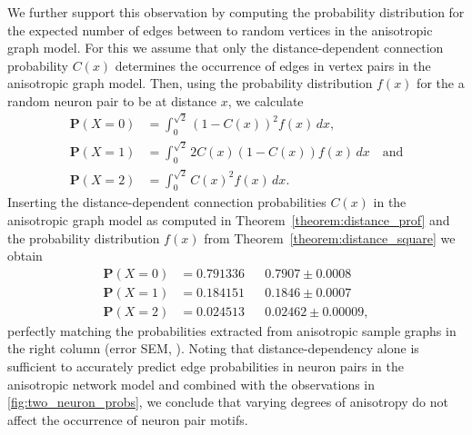 We further support this observation by computing the probability
distribution for the expected number of edges between to random
vertices in the anisotropic graph model. For this we assume that only
the distance-dependent connection probability $C(x)$ determines the
occurrence of edges in vertex pairs in the anisotropic graph
model. Then, using the probability distribution $f(x)$ for the a
random neuron pair to be at distance $x$, we calculate
\begin{align*}
\mathbf{P}(X=0) & = \int_0^{\sqrt{2}} (1-C(x))^2 f(x)\,
dx, \\
\mathbf{P}(X=1) & = \int_0^{\sqrt{2}} 2 C(x) (1-C(x)) f(x) \, dx \quad \mathrm{and}\\
\mathbf{P}(X=2) & = \int_0^{\sqrt{2}} C(x)^2 f(x) \, dx. 
\end{align*}
Inserting the distance-dependent connection probabilities $C(x)$ in
the anisotropic graph model as computed in
Theorem~\ref{theorem:distance_prof} and the probability distribution
$f(x)$ from Theorem~\ref{theorem:distance_square} we obtain
\begin{align*} 
\mathbf{P}(X=0) & = 0.791336 && 0.7907  \pm 0.0008\\
\mathbf{P}(X=1) & = 0.184151 && 0.1846  \pm 0.0007\\
\mathbf{P}(X=2) & = 0.024513 && 0.02462  \pm 0.00009,
\end{align*}
perfectly matching the probabilities extracted from anisotropic sample
graphs in the right column (error SEM, ). Noting
that distance-dependency alone is sufficient to accurately predict
edge probabilities in neuron pairs in the anisotropic network model
and combined with the observations in \autoref{fig:two_neuron_probs},
we conclude that varying degrees of anisotropy do not affect the
occurrence of neuron pair motifs.








